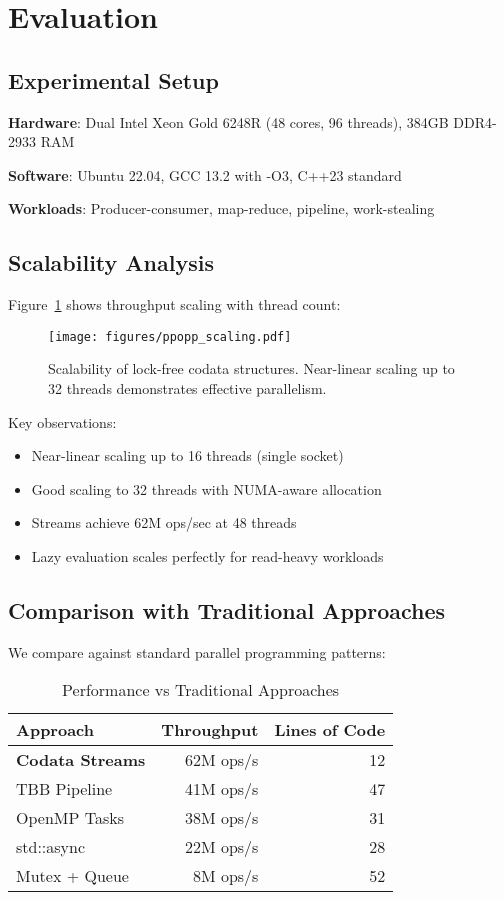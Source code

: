\documentclass[sigconf,review,anonymous]{acmart}
\begin{document}
\section{Evaluation}

\subsection{Experimental Setup}

\textbf{Hardware}: Dual Intel Xeon Gold 6248R (48 cores, 96 threads), 384GB DDR4-2933 RAM

\textbf{Software}: Ubuntu 22.04, GCC 13.2 with -O3, C++23 standard

\textbf{Workloads}: Producer-consumer, map-reduce, pipeline, work-stealing

\subsection{Scalability Analysis}

Figure~\ref{fig:scalability} shows throughput scaling with thread count:

\begin{figure}[h]
\centering
\texttt{[image: figures/ppopp\_scaling.pdf]}
\caption{Scalability of lock-free codata structures. Near-linear scaling up to 32 threads demonstrates effective parallelism.}
\label{fig:scalability}
\end{figure}

Key observations:
\begin{itemize}
\item Near-linear scaling up to 16 threads (single socket)
\item Good scaling to 32 threads with NUMA-aware allocation
\item Streams achieve 62M ops/sec at 48 threads
\item Lazy evaluation scales perfectly for read-heavy workloads
\end{itemize}

\subsection{Comparison with Traditional Approaches}

We compare against standard parallel programming patterns:

\begin{table}[h]
\centering
\caption{Performance vs Traditional Approaches}
\label{tab:comparison}
\begin{tabular}{lrr}
\toprule
Approach & Throughput & Lines of Code \\
\midrule
\textbf{Codata Streams} & 62M ops/s & 12 \\
TBB Pipeline & 41M ops/s & 47 \\
OpenMP Tasks & 38M ops/s & 31 \\
std::async & 22M ops/s & 28 \\
Mutex + Queue & 8M ops/s & 52 \\
\bottomrule
\end{tabular}
\end{table}
\end{document}
